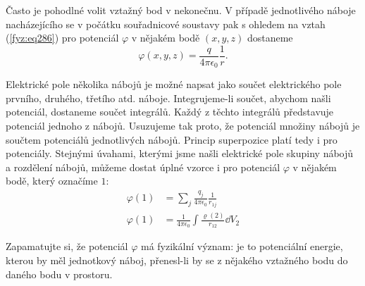     Často je pohodlné volit vztažný	bod v nekonečnu. V případě jednotlivého	náboje nacházejícího se 
    v počátku souřadnicové soustavy pak s ohledem	na vztah (\ref{fyz:eq286}) pro 
    potenciál 
    \(\varphi\) v nějakém bodě \((x, y, z)\) dostaneme
    \begin{equation}\label{fyz:fey_eq_elstat23}
     \varphi(x, y, z) = \frac{q}{4\pi\epsilon_0}\frac{1}{r}. 
    \end{equation}

    Elektrické pole několika nábojů je možné napsat jako součet elektrického pole prvního, druhého, 
    třetího atd. náboje. Integrujeme-li součet, abychom našli potenciál, dostaneme součet 
    integrálů. Každý z těchto integrálů představuje potenciál jednoho z nábojů. Usuzujeme tak 
    proto, že potenciál množiny nábojů je součtem potenciálů jednotlivých nábojů. Princip 
    superpozice platí tedy i pro potenciály. Stejnými úvahami, kterými jsme našli elektrické pole 
    skupiny nábojů a rozdělení nábojů, můžeme dostat úplné vzorce i pro potenciál \(\varphi\) v 
    nějakém bodě, který označíme \(1\):
    \begin{subequations}\label{fyz:eq1007}
    \begin{align}
     \varphi(1) &= 
       \sum\limits_{j}\frac{q_j}{4\pi\epsilon_0}\frac{1}{r_{1j}}     \label{fyz:eq1007a} \\ 
     \varphi(1) &= 
       \frac{1}{4\pi\epsilon_0}\int\frac{\varrho(2)}{r_{12}}\dd{V_2} \label{fyz:eq1007b}
    \end{align}
    \end{subequations}
     	    
    Zapamatujte si, že potenciál \(\varphi\) má fyzikální význam: je to potenciální energie, kterou 
    by měl jednotkový náboj, přenesl-li by se z nějakého vztažného bodu do daného bodu v prostoru.
    
